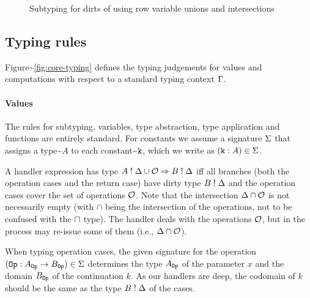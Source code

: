 \documentclass[master=cws,masteroption=ai, english]{kulemt}
\begin{document}
\begin{figure}[h!]
\begin{center}
{\begin{minipage}{0.95\columnwidth}
\begin{mathpar}

\end{mathpar}
\end{minipage}
}
\end{center}
\caption{Subtyping for dirts of \core using row variable unions and intersections}\label{fig:core-subtyping-dirt2}
\end{figure}

\subsection{Typing rules}\label{typing-rules-1}

Figure\textasciitilde{}\ref{fig:core-typing} defines the typing
judgements for values and computations with respect to a standard typing
context \(\ctx\).

\paragraph{Values}

The rules for subtyping, variables, type abstraction, type application
and functions are entirely standard. For constants we assume a signature
\(\sig\) that assigns a type\textasciitilde{}\(A\) to each
constant\textasciitilde{}\(\const\), which we write as
\((\const \T A) \in \sig\).

A handler expression has type \(A \E \dirt \cup \ops \hto B \E \dirt\)
iff all branches (both the operation cases and the return case) have
dirty type \(B \E \dirt\) and the operation cases cover the set of
operations \(\ops\). Note that the intersection \(\dirt \cap \ops\) is
not necessarily empty (with \(\cap\) being the intersection of the
operations, not to be confused with the \(\intersection\) type). The
handler deals with the operations \(\ops\), but in the process may
re-issue some of them (i.e., \(\dirt \cap \ops\)).

When typing operation cases, the given signature for the operation
\((\op \T A_\op \to B_\op) \in \sig\) determines the type \(A_\op\) of
the parameter \(x\) and the domain \(B_\op\) of the continuation \(k\).
As our handlers are deep, the codomain of \(k\) should be the same as
the type \(B \E \dirt\) of the cases.
\end{document}
